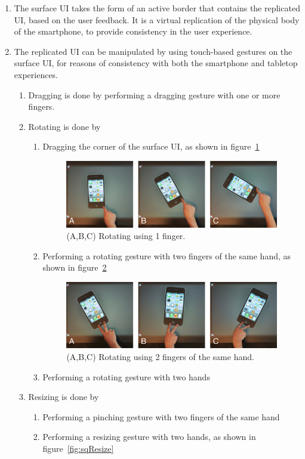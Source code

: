 \begin{enumerate}[{DD}-1]
\item The surface UI takes the form of an active border that contains the replicated UI, based on the user feedback.
It is a virtual replication of the physical body of the smartphone, to provide consistency in the user experience.
\item The replicated UI can be manipulated by using touch-based gestures on the surface UI, for reasons of consistency with both the smartphone and tabletop experiences.
	\begin{enumerate}[{DD-2}a]
	\item Dragging is done by performing a dragging gesture with one or more fingers.
	\item Rotating is done by
		\begin{enumerate}[1{.}]
		\item Dragging the corner of the surface UI, as shown in figure~\ref{fig:sq1f}

\begin{figure}[htb]
  \centering
    \includegraphics[width=0.7\linewidth]{images/sq1f}
  \caption{(A,B,C) Rotating using 1 finger.}
  \label{fig:sq1f}
\end{figure}

		\item Performing a rotating gesture with two fingers of the same hand, as shown in figure~\ref{fig:sq2f1h}

\begin{figure}[htb]
  \centering
    \includegraphics[width=0.7\linewidth]{images/sq2f1h}
  \caption{(A,B,C) Rotating using 2 fingers of the same hand.}
  \label{fig:sq2f1h}
\end{figure}

		\item Performing a rotating gesture with two hands
		\end{enumerate}
	\item Resizing is done by
		\begin{enumerate}[1{.}]
		\item Performing a pinching gesture with two fingers of the same hand
		\item Performing a resizing gesture with two hands, as shown in figure~\ref{fig:sqResize}
		

\end{enumerate}
\end{enumerate}
\end{enumerate}
